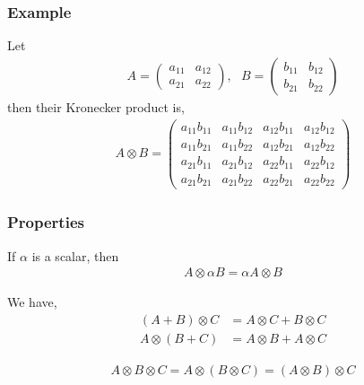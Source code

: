 \subsubsection{Example}
Let 
\begin{align*}
A = 
\left(\begin{array}{cc}
a_{11} & a_{12}
\\
a_{21} & a_{22}
\end{array}\right),~~~
B = 
\left(\begin{array}{cc}
b_{11} & b_{12}
\\
b_{21} & b_{22}
\end{array}\right)
\end{align*}
then their Kronecker product is,
\begin{align}
A \otimes B = 
\left(\begin{array}{cccc}
a_{11}b_{11} & a_{11}b_{12} & a_{12}b_{11} & a_{12}b_{12}
\\
a_{11}b_{21} & a_{11}b_{22} & a_{12}b_{21} & a_{12}b_{22}
\\
a_{21}b_{11} & a_{21}b_{12} & a_{22}b_{11} & a_{22}b_{12}
\\
a_{21}b_{21} & a_{21}b_{22} & a_{22}b_{21} & a_{22}b_{22}
\end{array}\right)
\end{align}


\subsubsection{Properties}
\begin{proposition}
If $\alpha$ is a scalar, then 
\begin{align}
A \otimes \alpha B = \alpha A \otimes B
\end{align}
\end{proposition}

\begin{proposition}
We have,
\begin{align}
( A + B ) \otimes C &= A \otimes C + B \otimes C
\\
A \otimes ( B + C ) &= A \otimes B + A \otimes C
\end{align}
\end{proposition}

\begin{proposition}[Associativity]
\begin{align}
A \otimes B \otimes C = A \otimes ( B \otimes C ) = ( A \otimes B ) \otimes C
\end{align}
\end{proposition}

